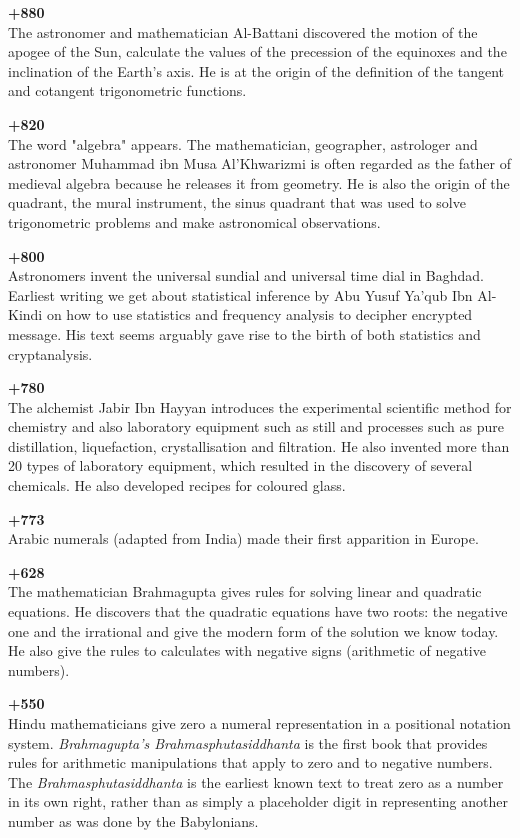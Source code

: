 \textbf{+880}\\
The astronomer and mathematician Al-Battani discovered the motion of the apogee of the Sun, calculate the values of the precession of the equinoxes and the inclination of the Earth's axis. He is at the origin of the definition of the tangent and cotangent trigonometric functions.

\textbf{+820}\\
The word "algebra" appears. The mathematician, geographer, astrologer and astronomer Muhammad ibn Musa Al'Khwarizmi is often regarded as the father of medieval algebra because he releases it from geometry. He is also the origin of the quadrant, the mural instrument, the sinus quadrant that was used to solve trigonometric problems and make astronomical observations.

\textbf{+800}\\
Astronomers invent the universal sundial and universal time dial in Baghdad. Earliest writing we get about statistical inference by Abu Yusuf Ya'qub Ibn Al-Kindi on how to use statistics and frequency analysis to decipher encrypted message. His text seems arguably gave rise to the birth of both statistics and cryptanalysis.

\textbf{+780}\\
The alchemist Jabir Ibn Hayyan introduces the experimental scientific method for chemistry and also laboratory equipment such as still and processes such as pure distillation, liquefaction, crystallisation and filtration. He also invented more than 20 types of laboratory equipment, which resulted in the discovery of several chemicals. He also developed recipes for coloured glass.

\textbf{+773}\\
Arabic numerals (adapted from India) made their first apparition in Europe.

\textbf{+628}\\
The mathematician Brahmagupta gives rules for solving linear and quadratic equations. He discovers that the quadratic equations have two roots: the negative one and the irrational and give the modern form of the solution we know today. He also give the rules to calculates with negative signs (arithmetic of negative numbers).

\textbf{+550}\\
Hindu mathematicians give zero a numeral representation in a positional notation system. \textit{Brahmagupta's Brahmasphutasiddhanta} is the first book that provides rules for arithmetic manipulations that apply to zero and to negative numbers. The \textit{Brahmasphutasiddhanta} is the earliest known text to treat zero as a number in its own right, rather than as simply a placeholder digit in representing another number as was done by the Babylonians.

